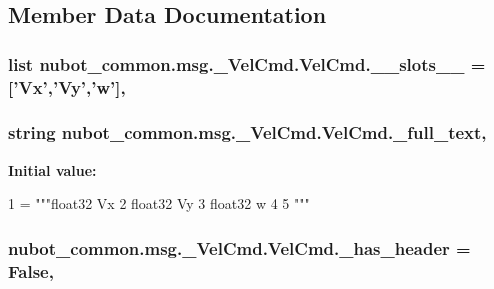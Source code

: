 \subsection{Member Data Documentation}
\hypertarget{classnubot__common_1_1msg_1_1__VelCmd_1_1VelCmd_a66e5ab2efcbbf8fcc3a919147a57404f}{
\subsubsection[{\-\_\-\-\_\-slots\-\_\-\-\_\-}]{\setlength{\rightskip}{0pt plus 5cm}list nubot\-\_\-common.\-msg.\-\_\-\-Vel\-Cmd.\-Vel\-Cmd.\-\_\-\-\_\-slots\-\_\-\-\_\- = \mbox{[}'{\bf Vx}','{\bf Vy}','{\bf w}'\mbox{]}\hspace{0.3cm}{\ttfamily [static]}, {\ttfamily [private]}}}\label{classnubot__common_1_1msg_1_1__VelCmd_1_1VelCmd_a66e5ab2efcbbf8fcc3a919147a57404f}
\hypertarget{classnubot__common_1_1msg_1_1__VelCmd_1_1VelCmd_ae2431998acedfc22fb82f279624d57c4}{
\subsubsection[{\-\_\-full\-\_\-text}]{\setlength{\rightskip}{0pt plus 5cm}string nubot\-\_\-common.\-msg.\-\_\-\-Vel\-Cmd.\-Vel\-Cmd.\-\_\-full\-\_\-text\hspace{0.3cm}{\ttfamily [static]}, {\ttfamily [private]}}}\label{classnubot__common_1_1msg_1_1__VelCmd_1_1VelCmd_ae2431998acedfc22fb82f279624d57c4}
{\bfseries Initial value\-:}
\begin{DoxyCode}
1 = \textcolor{stringliteral}{"""float32 Vx}
2 \textcolor{stringliteral}{float32 Vy}
3 \textcolor{stringliteral}{float32 w}
4 \textcolor{stringliteral}{}
5 \textcolor{stringliteral}{"""}
\end{DoxyCode}
\hypertarget{classnubot__common_1_1msg_1_1__VelCmd_1_1VelCmd_a99a3ace04bc3c1e1c224c7fecc1ef5f6}{
\subsubsection[{\-\_\-has\-\_\-header}]{\setlength{\rightskip}{0pt plus 5cm}nubot\-\_\-common.\-msg.\-\_\-\-Vel\-Cmd.\-Vel\-Cmd.\-\_\-has\-\_\-header = False\hspace{0.3cm}{\ttfamily [static]}, {\ttfamily [private]}}}\label{classnubot__common_1_1msg_1_1__VelCmd_1_1VelCmd_a99a3ace04bc3c1e1c224c7fecc1ef5f6}
